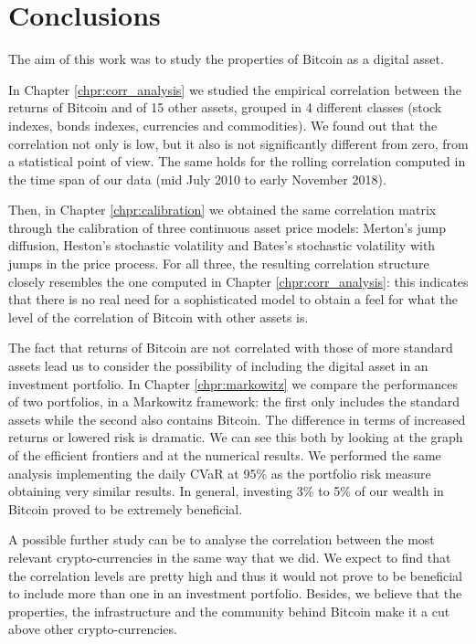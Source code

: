 \chapter{Conclusions}
\label{chpr:conclusion}


The aim of this work was to study the properties of Bitcoin as a digital asset.

In Chapter \ref{chpr:corr_analysis} we studied the empirical correlation between the returns of Bitcoin and of 15 other assets, grouped in 4 different classes (stock indexes, bonds indexes, currencies and commodities). We found out that the correlation not only is low, but it also is not significantly different from zero, from a statistical point of view. The same holds for the rolling correlation computed in the time span of our data (mid July 2010 to early November 2018).

Then, in Chapter \ref{chpr:calibration} we obtained the same correlation matrix through the calibration of three continuous asset price models: Merton's jump diffusion, Heston's stochastic volatility and Bates's stochastic volatility with jumps in the price process.
For all three, the resulting correlation structure closely resembles the one computed in Chapter \ref{chpr:corr_analysis}: this indicates that there is no real need for a sophisticated model to obtain a feel for what the level of the correlation of Bitcoin with other assets is.

The fact that returns of Bitcoin are not correlated with those of more standard assets lead us to consider the possibility of including the digital asset in an investment portfolio.
In Chapter \ref{chpr:markowitz} we compare the performances of two portfolios, in a Markowitz framework: the first only includes the standard assets while the second also contains Bitcoin. The difference in terms of increased returns or lowered risk is dramatic. We can see this both by looking at the graph of the efficient frontiers and at the numerical results.
We performed the same analysis implementing the daily CVaR at 95\% as the portfolio risk measure obtaining very similar results.
In general, investing 3\% to 5\% of our wealth in Bitcoin proved to be extremely beneficial.

\bigskip

A possible further study can be to analyse the correlation between the most relevant crypto-currencies in the same way that we did. We expect to find that the correlation levels are pretty high and thus it would not prove to be beneficial to include more than one in an investment portfolio. 
Besides, we believe that the properties, the  infrastructure and the community behind Bitcoin make it a cut above other crypto-currencies.
 
